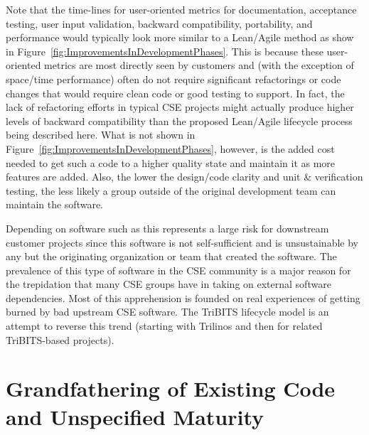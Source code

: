 \documentclass[11pt]{SANDreport}
\begin{document}
Note that the time-lines for user-oriented metrics for documentation,
acceptance testing, user input validation, backward compatibility,
portability, and performance would typically look more similar to a
Lean/Agile method as show in
Figure~\ref{fig:ImprovementsInDevelopmentPhases}.  This is because
these user-oriented metrics are most directly seen by customers and
(with the exception of space/time performance) often do not require
significant refactorings or code changes that would require clean code
or good testing to support.  In fact, the lack of refactoring efforts
in typical CSE projects might actually produce higher levels of
backward compatibility than the proposed Lean/Agile lifecycle process
being described here.  What is not shown in
Figure~\ref{fig:ImprovementsInDevelopmentPhases}, however, is the
added cost needed to get such a code to a higher quality state and
maintain it as more features are added.  Also, the lower the
design/code clarity and unit \& verification testing, the less likely
a group outside of the original development team can maintain the
software.

Depending on software such as this represents a large risk for
downstream customer projects since this software is not
self-sufficient and is unsustainable by any but the originating
organization or team that created the software.  The prevalence of
this type of software in the CSE community is a major reason for the
trepidation that many CSE groups have in taking on external software
dependencies.  Most of this apprehension is founded on real
experiences of getting burned by bad upstream CSE software.  The
TriBITS lifecycle model is an attempt to reverse this trend (starting
with Trilinos and then for related TriBITS-based projects).


%
{}\section{Grandfathering of Existing Code and Unspecified Maturity}
\label{sec:grandfathering}
%
\end{document}
